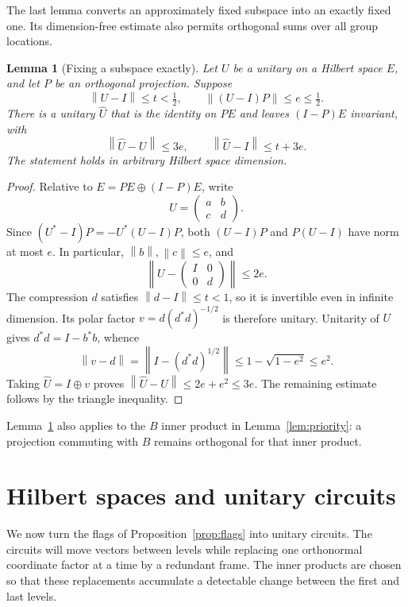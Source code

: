 \documentclass[11pt]{article}
\numberwithin{equation}{section}
\newtheorem{lemma}[theorem]{Lemma}
\theoremstyle{definition}
\theoremstyle{remark}
\newcommand{\norm}[1]{\left\lVert#1\right\rVert}
\newcommand{\id}{I}
\begin{document}
The last lemma converts an approximately fixed subspace into an exactly
fixed one.  Its dimension-free estimate also permits orthogonal sums
over all group locations.

\begin{lemma}[Fixing a subspace exactly]\label{lem:truncate}
Let $U$ be a unitary on a Hilbert space $E$, and let $P$ be an orthogonal
projection.  Suppose
\[
 \norm{U-\id}\leq t<\tfrac12,
 \qquad \norm{(U-\id)P}\leq e\leq\tfrac12.
\]
There is a unitary $\widehat U$ that is the identity on $PE$ and leaves
$(\id-P)E$ invariant, with
\[
 \norm{\widehat U-U}\leq3e,
 \qquad \norm{\widehat U-\id}\leq t+3e.
\]
The statement holds in arbitrary Hilbert space dimension.
\end{lemma}

\begin{proof}
Relative to $E=PE\oplus(\id-P)E$, write
\[
 U=\begin{pmatrix}a&b\\c&d\end{pmatrix}.
\]
Since $(U^*-\id)P=-U^*(U-\id)P$, both $(U-\id)P$ and
$P(U-\id)$ have norm at most $e$.  In particular,
$\norm{b},\norm{c}\leq e$, and
\[
 \left\|U-\begin{pmatrix}\id&0\\0&d\end{pmatrix}\right\|
 \leq2e.
\]
The compression $d$ satisfies $\norm{d-\id}\leq t<1$, so it is
invertible even in infinite dimension.  Its polar factor
$v=d(d^*d)^{-1/2}$ is therefore unitary.  Unitarity of $U$ gives
$d^*d=\id-b^*b$, whence
\[
 \norm{v-d}
 =\norm{\id-(d^*d)^{1/2}}
 \leq1-\sqrt{1-e^2}\leq e^2.
\]
Taking $\widehat U=\id\oplus v$ proves
$\norm{\widehat U-U}\leq2e+e^2\leq3e$.
The remaining estimate follows by the triangle inequality.
\end{proof}

Lemma~\ref{lem:truncate} also applies to the $B$ inner product in
Lemma~\ref{lem:priority}: a projection commuting with $B$ remains
orthogonal for that inner product.

\section{Hilbert spaces and unitary circuits}\label{sec:construction}

We now turn the flags of Proposition~\ref{prop:flags} into unitary circuits.
The circuits will move vectors between levels while replacing one
orthonormal coordinate factor at a time by a redundant frame. The inner
products are chosen so that these replacements accumulate a detectable
change between the first and last levels.
\end{document}
